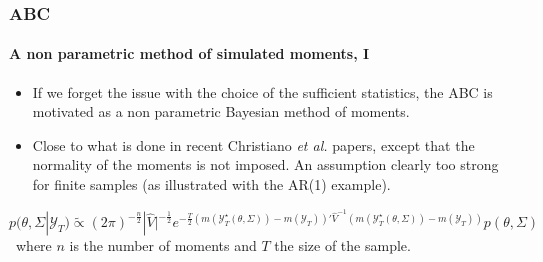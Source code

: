\documentclass[10pt]{beamer}
\begin{document}
\begin{frame}
  \frametitle{ABC}
  \framesubtitle{A non parametric method of simulated  moments, I}

  \bigskip
  
  \begin{itemize}
    
  \item If we forget the issue with the choice of the sufficient
    statistics, the ABC is motivated as a non parametric Bayesian
    method of moments.\newline

    \bigskip

  \item Close to what is done in recent Christiano \textit{et al.}
    papers, except that the normality of the moments is not
    imposed. An assumption clearly too strong for finite samples (as
    illustrated with the AR(1) example).\newline

  \end{itemize}

  \[
    p(\theta,\Sigma|\mathcal Y_T) \widetilde{\propto}
    (2\pi)^{-\frac{n}{2}}|\widehat V|^{-\frac{1}{2}}e^{-\frac{T}{2}\left(m\left(\mathcal Y_T^{\star}(\theta,\Sigma)\right)-m\left(\mathcal Y_T\right)\right)'\widehat V^{-1}\left(m\left(\mathcal Y_T^{\star}(\theta,\Sigma)\right)-m\left(\mathcal Y_T\right)\right)}p(\theta,\Sigma)
  \]
  \
  where $n$ is the number of moments and $T$ the size of the sample.

\end{frame}
\end{document}
